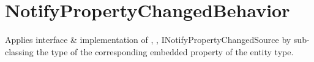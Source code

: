 \section{NotifyPropertyChangedBehavior}
\label{feature:NotifyPropertyChangedBehavior}
\ClearAPI
Applies interface \& implementation of , ,  {INotifyPropertyChangedSource} by sub-classing the type of the corresponding embedded property of the entity type.
\TODO
